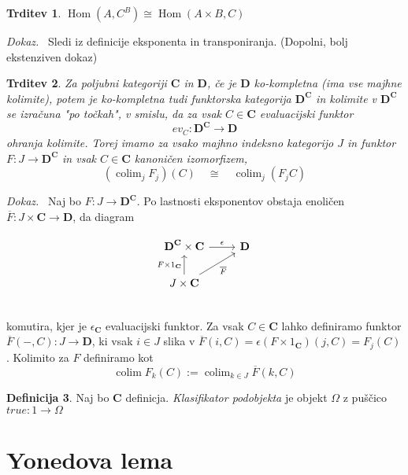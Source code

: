 \documentclass[12pt,a4paper]{book}
\theoremstyle{definition}
\newtheorem{definicija}{Definicija}[chapter]
\theoremstyle{plain}
\newtheorem{trditev}[definicija]{Trditev}
\newenvironment{dokaz}{\emph{Dokaz.}\ }{\hspace{\fill}{$\Box$}}
\theoremstyle{definition}
\theoremstyle{remark}
\newcommand{\cat}[1]{\textbf{#1}}
\DeclareMathOperator{\Hom}{Hom}
\DeclareMathOperator{\colim}{colim}
\begin{document}
\begin{trditev}
$\Hom(A, C^B) \cong \Hom(A \times B, C)$
\end{trditev}
\begin{dokaz}
Sledi iz definicije eksponenta in transponiranja. (Dopolni, bolj ekstenziven dokaz)
\end{dokaz}

\begin{trditev}
\label{ohranjanje kolimit}
Za poljubni kategoriji $\cat{C}$ in $\cat{D}$, če je $\cat{D}$ ko-kompletna (ima vse majhne kolimite), potem je ko-kompletna tudi funktorska kategorija $\cat{D}^{\cat{C}}$ in kolimite v $\cat{D}^{\cat{C}}$ se izračuna "po točkah", v smislu, da za vsak $C \in \cat{C}$ evaluacijski funktor
$$ev_C : \cat{D}^{\cat{C}} \to \cat{D}$$
ohranja kolimite. Torej imamo za vsako majhno indeksno kategorijo $J$ in funktor $F : J \to \cat{D}^{\cat{C}}$ in vsak $C \in \cat{C}$ kanoničen izomorfizem,
$$(\colim_j F_j)(C) \quad \cong \quad \colim_j (F_jC)$$
\end{trditev}
\begin{dokaz}
Naj bo $F: J \to \cat{D}^{\cat{C}}$. Po lastnosti eksponentov obstaja enoličen $\overline{F}: J \times \cat{C} \to \cat{D}$, da diagram

\begin{equation}
\begin{tikzcd}
\cat{D}^{\cat{C}} \times \cat{C} \ar[r, "\epsilon"] & \cat{D} \\
J \times \cat{C} \ar[u, "F \times 1_{\cat{C}}"] \ar[ur, "\overline{F}"'] \\
\end{tikzcd}
\end{equation}
komutira, kjer je $\epsilon_{\cat{C}}$ evaluacijski funktor.
Za vsak $C \in \cat{C}$ lahko definiramo funktor $\overline{F}(-,C): J \to \cat{D}$, ki vsak $i \in J$ slika v $\overline{F}(i,C) = \epsilon(F \times 1_\cat{C})(j,C) = F_j(C)$.
Kolimito za $F$ definiramo kot
$$\colim F_k(C) := \colim_{k \in J}\overline{F}(k,C)$$
\end{dokaz}

\begin{definicija}
Naj bo \textbf{C} definicja. \textit{Klasifikator podobjekta} je objekt $\Omega$ z puščico $true: 1 \to \Omega$
\end{definicija}


\chapter{Yonedova lema}
\end{document}
